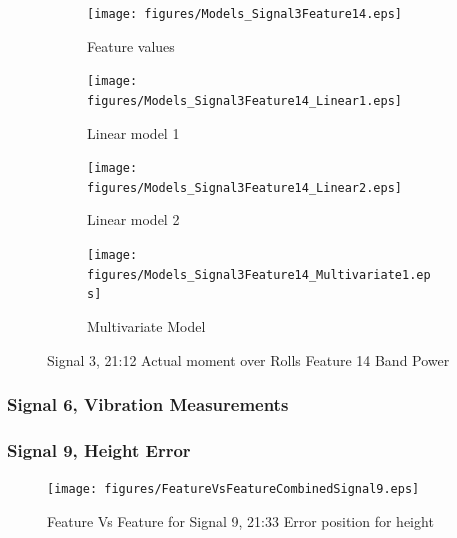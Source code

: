 \documentclass[]{article}
\begin{document}
\begin{figure}[H]
	\captionsetup[subfigure]{justification=Centering}
    \centering
		\begin{subfigure}{.45\textwidth}
		  \centering
    			\texttt{[image: figures/Models\_Signal3Feature14.eps]}
		  	\caption{Feature values}
		  	\label{fig:Models_Signal3Feature14}
		\end{subfigure}\hspace{\fill} %
		\begin{subfigure}{.45\textwidth}
		  \centering
 		   	\texttt{[image: figures/Models\_Signal3Feature14\_Linear1.eps]}
		  	\caption{Linear model 1}
		  	\label{fig:Models_Signal3Feature14_Linear1}
		\end{subfigure}
		\bigskip
		\begin{subfigure}{.45\textwidth}
		  \centering
    			\texttt{[image: figures/Models\_Signal3Feature14\_Linear2.eps]}
		  	\caption{Linear model 2}
		  	\label{fig:Models_Signal3Feature14_Linear2}
		\end{subfigure}\hspace{\fill} %
		\begin{subfigure}{.45\textwidth}
		  \centering
 		   	\texttt{[image: figures/Models\_Signal3Feature14\_Multivariate1.eps]}
		  	\caption{Multivariate Model}
		  	\label{fig:Models_Signal3Feature14_Multivariate1}
		\end{subfigure}
    \caption{Signal 3, 21:12 Actual moment over Rolls Feature 14 Band Power}
    \label{fig:Models_Signal3Feature14_Caption}
\end{figure}






\subsubsection*{Signal 6, Vibration Measurements}





\subsubsection*{Signal 9, Height Error}
\begin{figure}[H]
    \centering
    \texttt{[image: figures/FeatureVsFeatureCombinedSignal9.eps]}
    \caption{Feature Vs Feature for Signal 9, 21:33 Error position for height}
    \label{fig:FeatureVsFeatureCombinedSignal9}
\end{figure}
\end{document}
